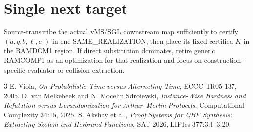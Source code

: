 \documentclass[11pt]{article}
\begin{document}
\section*{Single next target}
Source-transcribe the actual vMS/SGL downstream map sufficiently to certify $(a,q,b,\ell,c_0)$ in one SAME\_REALIZATION, then place its fixed certified $K$ in the RAMDOM1 region. If direct substitution dominates, retire generic RAMCOMP1 as an optimization for that realization and focus on construction-specific evaluator or collision extraction.

\begin{thebibliography}{3}
 E. Viola, \emph{On Probabilistic Time versus Alternating Time}, ECCC TR05-137, 2005.
 D. van Melkebeek and N. Mocelin Sdroievski, \emph{Instance-Wise Hardness and Refutation versus Derandomization for Arthur--Merlin Protocols}, Computational Complexity 34:15, 2025.
 S. Akshay et al., \emph{Proof Systems for QBF Synthesis: Extracting Skolem and Herbrand Functions}, SAT 2026, LIPIcs 377:3:1--3:20.
\end{thebibliography}
\end{document}
